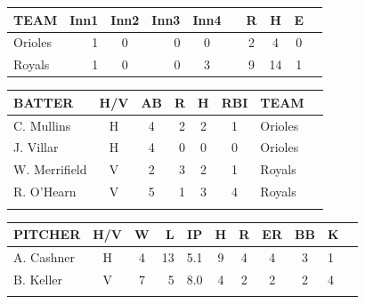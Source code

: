 \documentclass[11pt,a4paper]{article}
\newcommand{\lform}[1]{\textsf{\scriptsize{#1}}}
\begin{document}
\begin{figure*}
\begin{small}
\begin{minipage}{0.4\textwidth}
\hspace*{.3cm}\begin{tabular}{@{}l@{~~}r@{~~}c@{~~}r@{~~}c@{~~}c@{~~}c@{~~}c@{~~}c@{~~}l@{}} \hline
\lform{TEAM}      & \lform{Inn1} &\lform{Inn2} &\lform{Inn3} & \lform{Inn4} & \lform{} & \lform{R}& \lform{H} & \lform{E} & \lform{} \\ \hline
\lform{Orioles} &\lform{1} &\lform{0} &\lform{0} & \lform{0} & \lform{} & \lform{2} & \lform{4} & \lform{0} & \lform{} \\ 
\lform{Royals} &\lform{1} &\lform{0} &\lform{0} & \lform{3} &\lform{} & \lform{9} & \lform{14} & \lform{1} & \lform{} \\ \hline
\end{tabular}


\vspace{.3cm}
\hspace*{.3cm}\begin{tabular}{@{}l@{~~}c@{~~}c@{~}r@{~~}c@{~~}c@{~~}l@{~~}l@{}} \hline
\lform{BATTER} & \lform{H/V} & \lform{AB} & \lform{R} & \lform{H}& \lform{RBI} &  \lform{TEAM} & \lform{}\\ \hline
\lform{C. Mullins} & \lform{H} & \lform{4} & \lform{2} & \lform{2}& \lform{1} &   \lform{Orioles} & \lform{}\\
\lform{J. Villar} & \lform{H} & \lform{4} & \lform{0} & \lform{0}& \lform{0} & \lform{Orioles} & \lform{}\\
\lform{W. Merrifield} & \lform{V}& \lform{2} & \lform{3} & \lform{2} & \lform{1}& \lform{Royals} & \lform{}\\
\lform{R. O'Hearn} & \lform{V}& \lform{5} & \lform{1} & \lform{3} & \lform{4}&  \lform{Royals} & \lform{}\\

\lform{} & \lform{} & \lform{} & \lform{} &  \lform{} &  \lform{} & \lform{}\\\hline
\end{tabular}

\vspace{.3cm}
\begin{tabular}{@{}l@{~~}c@{~~}c@{~}r@{~~}c@{~~}c@{~~}c@{~~}c@{~~}c@{~~}l@{~~}l@{}} \hline
\lform{PITCHER} & \lform{H/V} & \lform{W} & \lform{L} & \lform{IP}& \lform{H} &  \lform{R} &  \lform{ER}&  \lform{BB}&  \lform{K} & \lform{}\\ \hline
\lform{A. Cashner} & \lform{H} & \lform{4} & \lform{13} & \lform{5.1}& \lform{9} &   \lform{4}&   \lform{4} &   \lform{3}&   \lform{1}& \lform{}\\
\lform{B. Keller} & \lform{V}& \lform{7} & \lform{5} & \lform{8.0} & \lform{4}&  \lform{2}  &   \lform{2}&   \lform{2}&   \lform{4} & \lform{}\\
\lform{} & \lform{} & \lform{} & \lform{} &  \lform{} &  \lform{} & \lform{}\\\hline
\end{tabular}



\end{minipage}
\end{small}
\end{figure*}
\end{document}
